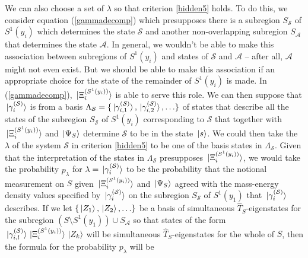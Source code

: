 We can also choose a set of $\lambda$ so that criterion \ref{hidden5} holds. To do this, we consider equation (\ref{gammadecomp}) which presupposes there is a subregion $S_{\mathcal{S}}$ of $S^1(y_i)$ which determines the state $\mathcal{S}$ and another non-overlapping subregion $S_{\mathcal{A}}$ that determines the state $\mathcal{A}$. In general, we wouldn't be able to make this association between subregions of $S^1(y_i)$ and states of  $\mathcal{S}$  and $\mathcal{A}$ -- after all, $\mathcal{A}$ might not even exist. But we should be able to make this association if an appropriate choice for the state of the remainder of $S^1(y_i)$ is made. In (\ref{gammadecomp}), $\ket*{\Xi_i^{(S^1(y_i))}}$ is able to serve this role. We can then suppose that $\ket*{\gamma_i^{(\mathcal{S})}}$ is from a basis $\Lambda_{\mathcal{S}}=\{\ket*{\gamma_{i,1}^{(\mathcal{S})}},\ket*{\gamma_{i,2}^{(\mathcal{S})}},\ldots\}$%
%
 of states that describe all the states of the subregion $S_{\mathcal{S}}$ of $S^1(y_i)$ corresponding to $\mathcal{S}$ that together with $\ket*{\Xi_i^{(S^1(y_i))}}$ and $\ket*{\Psi_S}$ determine $\mathcal{S}$ to be in the state $\ket*{s}$. We could then take the $\lambda$ of the system $\mathcal{S}$ in criterion \ref{hidden5} to be one of the basis states in $\Lambda_{\mathcal{S}}$. Given that the interpretation of the states in $\Lambda_{\mathcal{S}}$ presupposes $\ket*{\Xi_i^{(S^1(y_i))}}$, we would take the probability $p_\lambda$ for $\lambda = \ket*{\gamma_i^{(\mathcal{S})}}$ to be the probability that the notional measurement on $S$ given $\ket*{\Xi_i^{(S^1(y_i))}}$ and $\ket*{\Psi_S}$ agreed with the mass-energy density values specified by $ \ket*{\gamma_i^{(\mathcal{S})}}$ on the subregion $S_{\mathcal{S}}$ of $S^1(y_1)$ that $ \ket*{\gamma_i^{(\mathcal{S})}}$ describes. If we let $\{\ket*{Z_1}, \ket*{Z_2},\ldots  \}$ %
  be a basis of simultaneous $\hat{T}_S$-eigenstates for the subregion $(S\setminus S^1(y_1))\cup S_{\mathcal{A}}$ so that states of the form $\ket*{\gamma_{i,l}^{(\mathcal{S})}}\ket*{\Xi_i^{(S^1(y_i))}}\ket*{Z_k}$ will be simultaneous $\hat{T}_S$-eigenstates for the whole of $S$, then the formula for the probability $p_\lambda$ will be 
